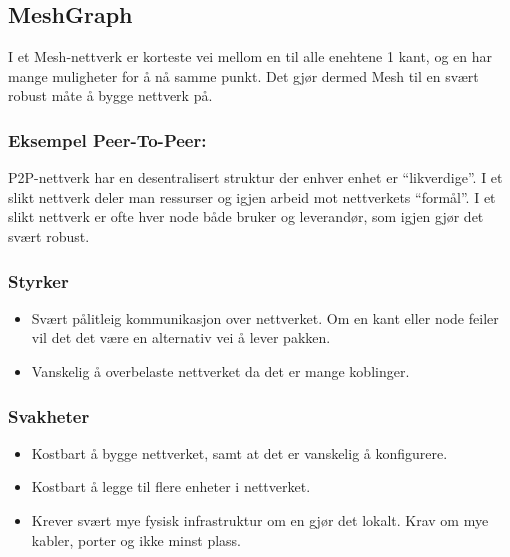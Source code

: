 \documentclass[11pt]{article}
\providecommand{\tightlist}{%
      \setlength{\itemsep}{0pt}\setlength{\parskip}{0pt}}
\begin{document}
\hypertarget{meshgraph}{%
\subsection*{MeshGraph}\label{meshgraph}}

I et Mesh-nettverk er korteste vei mellom en til alle enehtene 1 kant,
og en har mange muligheter for å nå samme punkt. Det gjør dermed Mesh
til en svært robust måte å bygge nettverk på.

\hypertarget{eksempel-peer-to-peer}{%
\subsubsection*{Eksempel Peer-To-Peer:}\label{eksempel-peer-to-peer}}

P2P-nettverk har en desentralisert struktur der enhver enhet er
``likverdige''. I et slikt nettverk deler man ressurser og igjen arbeid
mot nettverkets ``formål''. I et slikt nettverk er ofte hver node både
bruker og leverandør, som igjen gjør det svært robust.

\hypertarget{styrker-4}{%
\subsubsection*{Styrker}\label{styrker-4}}

\begin{itemize}
\tightlist
\item
  Svært pålitleig kommunikasjon over nettverket. Om en kant eller node
  feiler vil det det være en alternativ vei å lever pakken.
\item
  Vanskelig å overbelaste nettverket da det er mange koblinger.
\end{itemize}

\hypertarget{svakheter-4}{%
\subsubsection*{Svakheter}\label{svakheter-4}}

\begin{itemize}
\tightlist
\item
  Kostbart å bygge nettverket, samt at det er vanskelig å konfigurere.
\item
  Kostbart å legge til flere enheter i nettverket.
\item
  Krever svært mye fysisk infrastruktur om en gjør det lokalt. Krav om
  mye kabler, porter og ikke minst plass.
\end{itemize}
\end{document}
